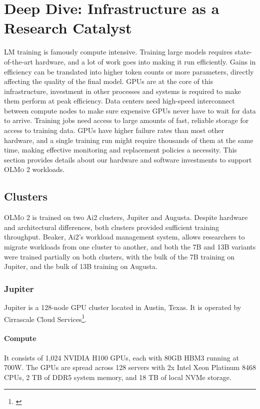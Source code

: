 \documentclass[table]{ai2style/ai2}
\newcommand{\olmotoo}{\textsc{OLMo 2}\xspace}
\newcommand{\diveInfra}{Infrastructure as a Research Catalyst}
\begin{document}
\section{Deep Dive: \diveInfra}
\label{sec:diveInfra}

LM training is famously compute intensive.
Training large models requires state-of-the-art hardware, and a lot of work goes into making it run efficiently.
Gains in efficiency can be translated into higher token counts or more parameters, directly affecting the quality of the final model.
GPUs are at the core of this infrastructure, investment in other processes and systems is required to make them perform at peak efficiency.
Data centers need high-speed interconnect between compute nodes to make sure expensive GPUs never have to wait for data to arrive.
Training jobs need access to large amounts of fast, reliable storage for access to training data.
GPUs have higher failure rates than most other hardware, and a single training run might require thousands of them at the same time, making effective monitoring and replacement policies a necessity.
This section provides details about our hardware and software investments to support \olmotoo workloads.

\subsection{Clusters}
\label{sec:clusters}

\olmotoo is trained on two Ai2 clusters, Jupiter and Augusta. Despite hardware and architectural differences, both clusters provided sufficient training throughput. Beaker, Ai2's workload management system, allows researchers to migrate workloads from one cluster to another, and both the 7B and 13B variants were trained partially on both clusters, with the bulk of the 7B training on Jupiter, and the bulk of 13B training on Augusta.

\subsubsection{Jupiter}

Jupiter is a 128-node GPU cluster located in Austin, Texas. 
It is operated by Cirrascale Cloud Services\footnote{\href{https://www.cirrascale.com/}{}}.

\paragraph{Compute} It consists of 1,024 NVIDIA H100 GPUs, each with 80GB HBM3 running at 700W. The GPUs are spread across 128 servers with 2x Intel Xeon Platinum 8468 CPUs, 2 TB of DDR5 system memory, and 18 TB of local NVMe storage.
\end{document}

